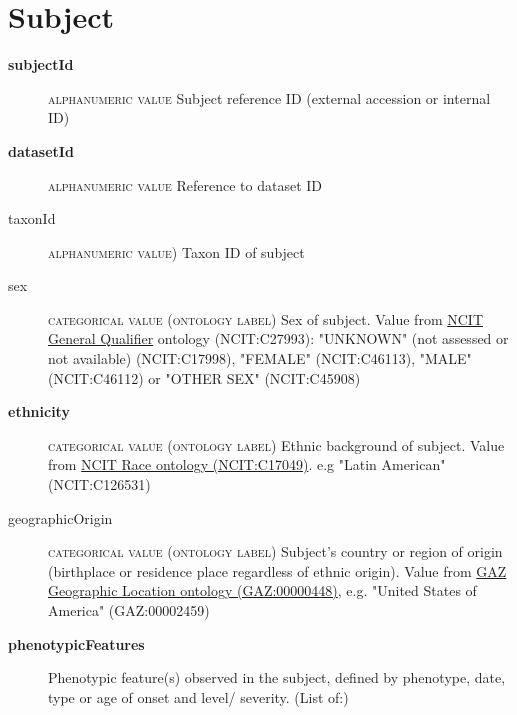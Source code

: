 \documentclass[a4paper, 10pt]{article}        %
\begin{document}
\section*{{\color{teal} Subject}}
\begin{description}
	\item[\textbf{subjectId}]  {\textsc{alphanumeric value}} Subject reference ID (external accession or internal ID)
	\item[\textbf{datasetId}] {\textsc{alphanumeric value}} Reference to dataset ID 
	\item[taxonId] {\textsc{alphanumeric value)}} Taxon ID of subject
	\item[sex] {\textsc{categorical value (ontology label)}} Sex of subject. Value from \href{https://www.ebi.ac.uk/ols/ontologies/ncit/terms?iri=http%3A%2F%2Fpurl.obolibrary.org%2Fobo%2FNCIT_C27993&viewMode=All&siblings=false}{NCIT General Qualifier} ontology (NCIT:C27993): "UNKNOWN" (not assessed or not available) (NCIT:C17998), "FEMALE" (NCIT:C46113), "MALE" (NCIT:C46112) or "OTHER SEX" (NCIT:C45908)
	\item[\textbf{ethnicity}] {\textsc{categorical value (ontology label)}} Ethnic background of subject. Value from \href{https://www.ebi.ac.uk/ols/ontologies/ncit/terms?iri=http%3A%2F%2Fpurl.obolibrary.org%2Fobo%2FNCIT_C17049}{NCIT Race ontology (NCIT:C17049)}. e.g "Latin American" (NCIT:C126531)
	\item[geographicOrigin] {\textsc{categorical value (ontology label)}} Subject's country or region of origin (birthplace or residence place regardless of ethnic origin). Value from \href{https://www.ebi.ac.uk/ols/ontologies/gaz/terms?iri=http%3A%2F%2Fpurl.obolibrary.org%2Fobo%2FGAZ_00000448}{GAZ Geographic Location ontology (GAZ:00000448)}, e.g. "United States of America" (GAZ:00002459)
	\item[\textbf{phenotypicFeatures}] Phenotypic feature(s) observed in the subject, defined by phenotype, date, type or age of onset and level/ severity. (List of:)

\end{description}
\end{document}
